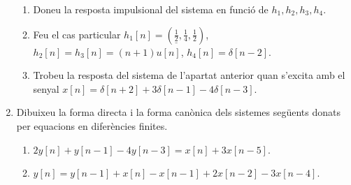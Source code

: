 \documentclass[a4paper,12pt]{article}
\begin{document}
\begin{enumerate}
  \begin{figure*}[htbp]
    \centering
    
  \end{figure*}
  \begin{enumerate}
  \item Doneu la resposta impulsional del sistema en funció de
    $h_1,h_2,h_3,h_4$.
  \item Feu el cas particular
    $h_1[n]=(\underline{\frac12},\frac14,\frac12)$,
    $h_2[n]=h_3[n]=(n+1)u[n]$, $h_4[n]=\delta[n-2]$.
  \item Trobeu la resposta del sistema de l'apartat anterior quan
    s'excita amb el senyal $x[n]=\delta[n+2]+3\delta[n-1]-4\delta[n-3]$. 
  \end{enumerate}

\item Dibuixeu la forma directa i la forma canònica dels sistemes
  següents donats per equacions en diferències finites.
  \begin{enumerate}
  \item $2y[n]+y[n-1]-4y[n-3]=x[n]+3x[n-5]$.
  \item $y[n]=y[n-1]+x[n]-x[n-1]+2x[n-2]-3x[n-4]$.
  \end{enumerate}

\end{enumerate}

%
%
\end{document}
